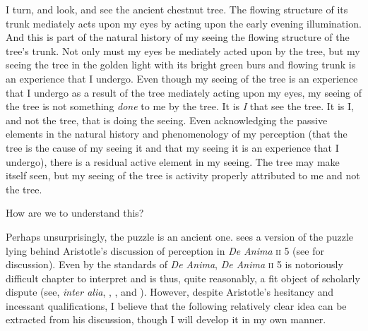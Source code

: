 \documentclass[12pt]{article}
\begin{document}
%

I turn, and look, and see the ancient chestnut tree. The flowing structure of its trunk mediately acts upon my eyes by acting upon the early evening illumination. And this is part of the natural history of my seeing the flowing structure of the tree's trunk. Not only must my eyes be mediately acted upon by the tree, but my seeing the tree in the golden light with its bright green burs and flowing trunk is an experience that I undergo. Even though my seeing of the tree is an experience that I undergo as a result of the tree mediately acting upon my eyes, my seeing of the tree is not something \emph{done} to me by the tree. It is \emph{I} that see the tree. It is I, and not the tree, that is doing the seeing. Even acknowledging the passive elements in the natural history and phenomenology of my perception (that the tree is the cause of my seeing it and that my seeing it is an experience that I undergo), there is a residual active element in my seeing. The tree may make itself seen, but my seeing of the tree is activity properly attributed to me and not the tree.

How are we to understand this?

Perhaps unsurprisingly, the puzzle is an ancient one. \citet[chapter 9.4.3]{Beere:2009vn} sees a version of the puzzle lying behind Aristotle's discussion of perception in \emph{De Anima} \textsc{ii} 5 (see \citealt[chapter 8]{Kalderon:2015fr} for discussion). Even by the standards of \emph{De Anima}, \emph{De Anima} \textsc{ii} 5 is notoriously difficult chapter to interpret and is thus, quite reasonably, a fit object of scholarly dispute (see, \emph{inter alia}, \citealt{Burnyeat:2002an}, \citealt{Heinaman:2007ys}, and \citealt{Bowin:2011uq}). However, despite Aristotle's hesitancy and incessant qualifications, I believe that the following relatively clear idea can be extracted from his discussion, though I will develop it in my own manner. 
\end{document}
